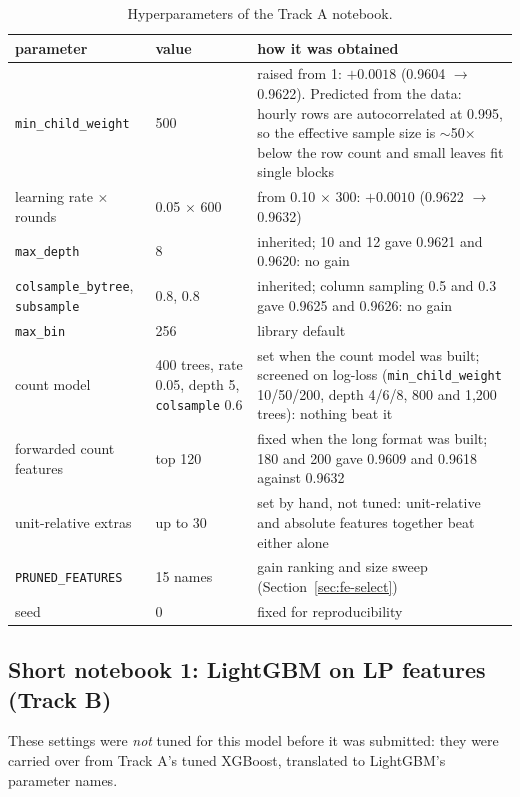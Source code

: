 \documentclass[11pt]{article}
\begin{document}
\begin{table}[H]
\centering\small
\begin{tabularx}{\linewidth}{L{3.6cm}L{3.2cm}Y}
\toprule
parameter & value & how it was obtained \\
\midrule
\texttt{min\_child\_weight} & 500 & raised from 1: $+0.0018$ (0.9604 $\to$ 0.9622). Predicted from the data:
  hourly rows are autocorrelated at 0.995, so the effective sample size is $\sim$50$\times$ below the
  row count and small leaves fit single blocks \\
learning rate $\times$ rounds & 0.05 $\times$ 600 & from 0.10 $\times$ 300: $+0.0010$ (0.9622 $\to$ 0.9632) \\
\texttt{max\_depth} & 8 & inherited; 10 and 12 gave 0.9621 and 0.9620: no gain \\
\texttt{colsample\_bytree}, \texttt{subsample} & 0.8, 0.8 & inherited; column sampling 0.5 and 0.3 gave
  0.9625 and 0.9626: no gain \\
\texttt{max\_bin} & 256 & library default \\
count model & 400 trees, rate 0.05, depth 5, \texttt{colsample} 0.6 & set when the count model was built;
  screened on log-loss (\texttt{min\_child\_weight} 10/50/200, depth 4/6/8, 800 and
  1{,}200 trees): nothing beat it \\
forwarded count features & top 120 & fixed when the long format was built; 180 and 200 gave
  0.9609 and 0.9618 against 0.9632 \\
unit-relative extras & up to 30 & set by hand, not tuned: unit-relative and absolute features together
  beat either alone \\
\texttt{PRUNED\_FEATURES} & 15 names & gain ranking and size sweep (Section~\ref{sec:fe-select}) \\
seed & 0 & fixed for reproducibility \\
\bottomrule
\end{tabularx}
\caption{Hyperparameters of the Track A notebook.}
\end{table}

\subsection{Short notebook 1: LightGBM on LP features (Track B)}

These settings were \emph{not} tuned for this model before it was submitted: they were carried over
from Track A's tuned XGBoost, translated to LightGBM's parameter names.
\end{document}
